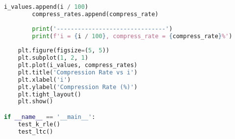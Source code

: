 \begin{lstlisting}[language=python, caption=Исходный код для тестирования алгоритмов, captionpos=b, frame=single]
        i_values.append(i / 100)
        compress_rates.append(compress_rate)
        
        print('-------------------------------')
        print(f'i = {i / 100}, compress_rate = {compress_rate}%')
        
    plt.figure(figsize=(5, 5))
    plt.subplot(1, 2, 1)
    plt.plot(i_values, compress_rates)
    plt.title('Compression Rate vs i')
    plt.xlabel('i')
    plt.ylabel('Compression Rate (%)')
    plt.tight_layout()
    plt.show()   

if __name__ == '__main__':
    test_k_rle()
    test_ltc()
\end{lstlisting}

\endinput
